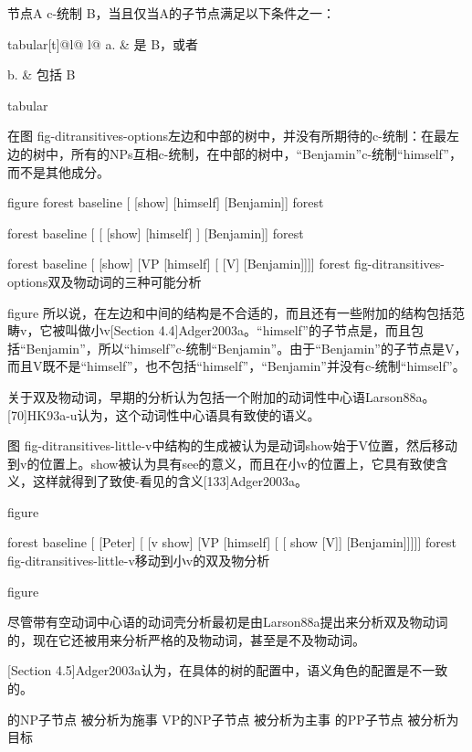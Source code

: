 节点A c-统制 B，当且仅当A的子节点满足以下条件之一：


tabular[t]@l@ l@
a. & 是 B，或者

b. & 包括 B


tabular

在图 fig-ditransitives-options左边和中部的树中，并没有所期待的c-统制：在最左边的树中，所有的NPs互相c-统制，在中部的树中，“Benjamin”c-统制“himself”，而不是其他成分。



figure
forest
baseline
[
 [show]
 [himself]
 [Benjamin]]
forest

forest
baseline
[
   [
     [show]
     [himself] ]
 [Benjamin]]
forest

forest
baseline
[
 [show]
 [VP
   [himself]
   [
    [V]
    [Benjamin]]]]
forest
fig-ditransitives-options双及物动词的三种可能分析

figure
所以说，在左边和中间的结构是不合适的，而且还有一些附加的结构包括范畴v，它被叫做小v[Section 4.4]Adger2003a。“himself”的子节点是，而且包括“Benjamin”，所以“himself”c-统制“Benjamin”。由于“Benjamin”的子节点是V，而且V既不是“himself”，也不包括“himself”，“Benjamin”并没有c-统制“himself”。







关于双及物动词，早期的分析认为包括一个附加的动词性中心语Larson88a。[70]HK93a-u认为，这个动词性中心语具有致使的语义。






图 fig-ditransitives-little-v中结构的生成被认为是动词show始于V位置，然后移动到v的位置上。show被认为具有see的意义，而且在小v的位置上，它具有致使含义，这样就得到了致使-看见的含义[133]Adger2003a。




figure

forest
baseline
[
  [Peter]
  [
   [v  show]
   [VP
     [himself]
     [
      [ show  [V]]
      [Benjamin]]]]]
forest
fig-ditransitives-little-v移动到小v的双及物分析

figure

尽管带有空动词中心语的动词壳分析最初是由Larson88a提出来分析双及物动词的，现在它还被用来分析严格的及物动词，甚至是不及物动词。




[Section 4.5]Adger2003a认为，在具体的树的配置中，语义角色的配置是不一致的。



的NP子节点  被分析为施事
VP的NP子节点  被分析为主事
的PP子节点  被分析为目标




